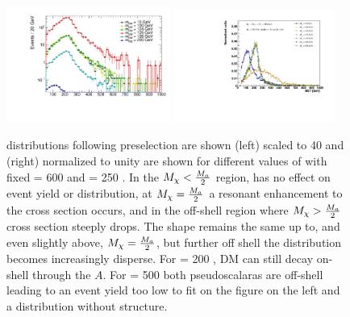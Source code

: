 \begin{figure}
\centering
\includegraphics[width=0.48\textwidth]{texinputs/04_grid/figures/monoz/leptonic/mDMScan_mA600_ma250_MET.pdf}
\includegraphics[width=0.47\textwidth]{texinputs/04_grid/figures/monoz/leptonic/mDMScan_ma250.pdf}
\caption{\MET distributions following preselection are shown (left) scaled to 40 \ifb and (right) normalized to unity are shown for different values of \mDM with fixed \mA = 600 \GeV and \ma = 250 \GeV.  In the $M_{\chi} < \frac{M_{a}}{2}$ region, \mDM has no effect on event yield or \MET distribution, at $M_{\chi} = \frac{M_{a}}{2}$ a resonant enhancement to the cross section occurs, and in the off-shell region where  $M_{\chi} > \frac{M_{a}}{2}$ cross section steeply drops.  The \MET shape remains the same up to, and even slightly above, $M_{\chi} = \frac{M_{a}}{2}$, but further off shell the \MET distribution becomes increasingly disperse.  For \mDM = 200 \GeV, DM can still decay on-shell through the $A$.  For \mDM = 500 \GeV both pseudoscalaras are off-shell leading to an event yield too low to fit on the figure on the left and a \MET distribution without structure.}
\label{fig:dm_scan_ll}
\end{figure}


